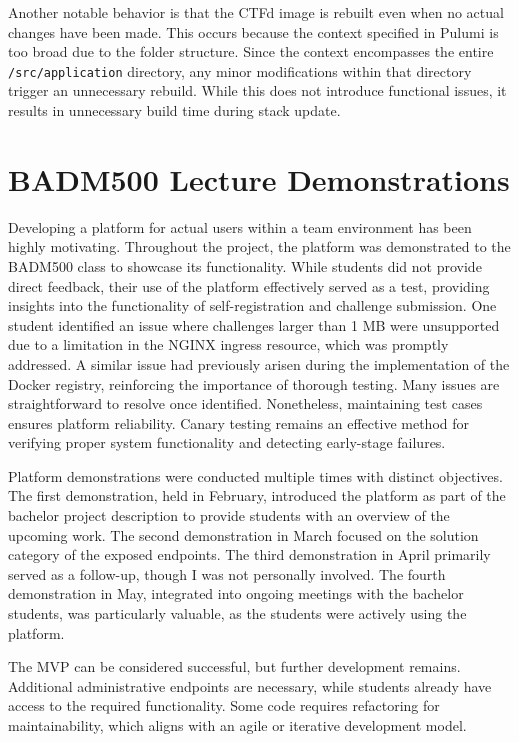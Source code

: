 Another notable behavior is that the CTFd image is rebuilt even when no actual changes have been made. This occurs because the context specified in Pulumi is too broad due to the folder structure. Since the context encompasses the entire \texttt{/src/application} directory, any minor modifications within that directory trigger an unnecessary rebuild. While this does not introduce functional issues, it results in unnecessary build time during stack update.

\section{BADM500 Lecture Demonstrations}
Developing a platform for actual users within a team environment has been highly motivating. Throughout the project, the platform was demonstrated to the BADM500 class to showcase its functionality. While students did not provide direct feedback, their use of the platform effectively served as a test, providing insights into the functionality of self-registration and challenge submission. One student identified an issue where challenges larger than 1 MB were unsupported due to a limitation in the NGINX ingress resource, which was promptly addressed. A similar issue had previously arisen during the implementation of the Docker registry, reinforcing the importance of thorough testing. Many issues are straightforward to resolve once identified. Nonetheless, maintaining test cases ensures platform reliability. Canary testing remains an effective method for verifying proper system functionality and detecting early-stage failures.

Platform demonstrations were conducted multiple times with distinct objectives. The first demonstration, held in February, introduced the platform as part of the bachelor project description to provide students with an overview of the upcoming work. The second demonstration in March focused on the solution category of the exposed endpoints. The third demonstration in April primarily served as a follow-up, though I was not personally involved. The fourth demonstration in May, integrated into ongoing meetings with the bachelor students, was particularly valuable, as the students were actively using the platform.

The MVP can be considered successful, but further development remains. Additional administrative endpoints are necessary, while students already have access to the required functionality. Some code requires refactoring for maintainability, which aligns with an agile or iterative development model.


